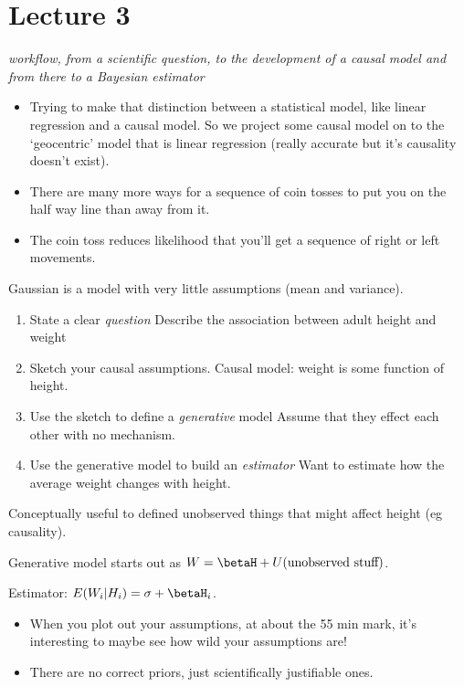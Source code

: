 \documentclass[11pt]{article}
\begin{document}
\hypertarget{lecture-3}{%
\section{Lecture 3}\label{lecture-3}}

\emph{workflow, from a scientific question, to the development of a
causal model and from there to a Bayesian estimator}

\begin{itemize}
\tightlist
\item
  Trying to make that distinction between a statistical model, like
  linear regression and a causal model. So we project some causal model
  on to the `geocentric' model that is linear regression (really
  accurate but it's causality doesn't exist).
\item
  There are many more ways for a sequence of coin tosses to put you on
  the half way line than away from it.
\item
  The coin toss reduces likelihood that you'll get a sequence of right
  or left movements.
\end{itemize}

Gaussian is a model with very little assumptions (mean and variance).

\begin{enumerate}
\def\labelenumi{(\arabic{enumi})}
\tightlist
\item
  State a clear \emph{question} Describe the association between adult
  height and weight
\item
  Sketch your causal assumptions. Causal model: weight is some function
  of height.
\item
  Use the sketch to define a \emph{generative} model Assume that they
  effect each other with no mechanism.
\item
  Use the generative model to build an \emph{estimator} Want to estimate
  how the average weight changes with height.
\end{enumerate}

Conceptually useful to defined unobserved things that might affect
height (eg causality).

Generative model starts out as
\(W = \betaH + U (\text{unobserved stuff})\).

Estimator: \(E(W_i|H_i) = \sigma + \betaH_i\).

\begin{itemize}
\tightlist
\item
  When you plot out your assumptions, at about the 55 min mark, it's
  interesting to maybe see how wild your assumptions are!
\item
  There are no correct priors, just scientifically justifiable ones.
\end{itemize}
\end{document}
